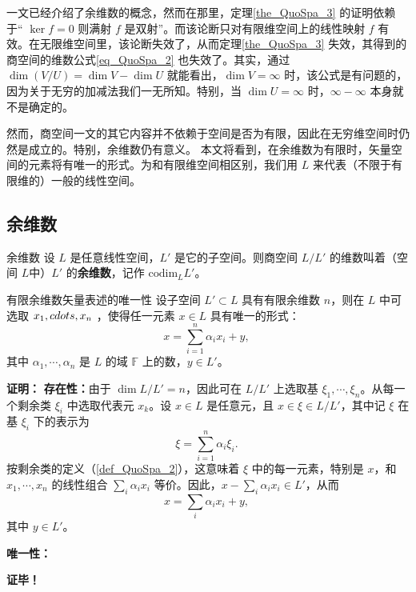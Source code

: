

一文已经介绍了余维数的概念，然而在那里，定理\autoref{the_QuoSpa_3} 的证明依赖于“ $\ker f=0$ 则满射 $f$ 是双射”。而该论断只对有限维空间上的线性映射 $f$ 有效。在无限维空间里，该论断失效了，从而定理\autoref{the_QuoSpa_3} 失效，其得到的商空间的维数公式\autoref{eq_QuoSpa_2} 也失效了。其实，通过 $\dim(V/U) = \dim V - \dim U$ 就能看出，$\dim V=\infty$ 时，该公式是有问题的，因为关于无穷的加减法我们一无所知。特别，当 $\dim U=\infty$ 时，$\infty-\infty$ 本身就不是确定的。

然而，商空间一文的其它内容并不依赖于空间是否为有限，因此在无穷维空间时仍然是成立的。特别，余维数仍有意义。 本文将看到，在余维数为有限时，矢量空间的元素将有唯一的形式。为和有限维空间相区别，我们用 $L$ 来代表（不限于有限维的）一般的线性空间。

\subsection{余维数}

\begin{definition}{余维数}
设 $L$ 是任意线性空间，$L'$ 是它的子空间。则商空间 $L/L'$ 的维数叫着（空间 $L$中）$L'$ 的\textbf{余维数}，记作 $\mathrm{codim}_L L'$。 
\end{definition}


\begin{theorem}{有限余维数矢量表述的唯一性}
设子空间 $L'\subset L$ 具有有限余维数 $n$，则在 $L$ 中可选取 $x_1,\\cdots,x_n$ ，使得任一元素 $x\in L$ 具有唯一的形式：
\begin{equation}
x=\sum_{i=1}^n\alpha_i x_i+y,~
\end{equation}
其中 $\alpha_1,\cdots,\alpha_n$ 是 $L$ 的域 $\mathbb F$ 上的数，$y\in L'$。
\end{theorem}

\textbf{证明：}
\textbf{存在性：}由于 $\dim L/L'=n$，因此可在 $L/L'$ 上选取基 $\xi_1,\cdots,\xi_n$。从每一个剩余类 $\xi_i$ 中选取代表元 $x_k$。设 $x\in L$ 是任意元，且 $x\in\xi\in L/L'$，其中记 $\xi$ 在基 $\xi_i$ 下的表示为
\begin{equation}
\xi=\sum_{i=1}^n\alpha_i\xi_i.~
\end{equation}
按剩余类的定义（\autoref{def_QuoSpa_2}），这意味着 $\xi$ 中的每一元素，特别是 $x$，和 $x_1,\cdots,x_n$ 的线性组合 $\sum_i\alpha_i x_i$ 等价。因此，$x-\sum_i\alpha_i x_i\in L'$，从而
\begin{equation}
x=\sum_i\alpha_i x_i+y,~
\end{equation}
其中 $y\in L'$。

\textbf{唯一性：}



\textbf{证毕！}

